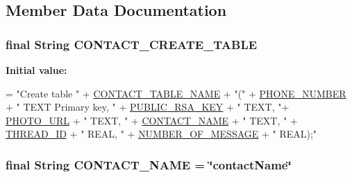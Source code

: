 \subsection{Member Data Documentation}
\hypertarget{a00010_a2ba8d9afb3e24e566831ab37cfd1cb66}{
\subsubsection[{C\+O\+N\+T\+A\+C\+T\+\_\+\+C\+R\+E\+A\+T\+E\+\_\+\+T\+A\+B\+L\+E}]{\setlength{\rightskip}{0pt plus 5cm}final String C\+O\+N\+T\+A\+C\+T\+\_\+\+C\+R\+E\+A\+T\+E\+\_\+\+T\+A\+B\+L\+E\hspace{0.3cm}{\ttfamily [static]}}}\label{a00010_a2ba8d9afb3e24e566831ab37cfd1cb66}
{\bfseries Initial value\+:}
\begin{DoxyCode}
=
            \textcolor{stringliteral}{"Create table "} + \hyperlink{a00010_a23f7383bb6a2bb7dc52d5c6366093d70}{CONTACT\_TABLE\_NAME} +
            \textcolor{stringliteral}{"("} + \hyperlink{a00010_ab82e52128049364660302a3d290f21ff}{PHONE\_NUMBER} + \textcolor{stringliteral}{" TEXT Primary key, "} +
            \hyperlink{a00010_a441e33a0577b5591c0885e4f8f2454f3}{PUBLIC\_RSA\_KEY} + \textcolor{stringliteral}{" TEXT, "}+
            \hyperlink{a00010_a8e08c45856be8a38b4ba9db84b11fa44}{PHOTO\_URL} + \textcolor{stringliteral}{" TEXT, "} +
            \hyperlink{a00010_abf69678c3e436dd320bb4322175b1eb1}{CONTACT\_NAME} + \textcolor{stringliteral}{" TEXT, "} +
            \hyperlink{a00010_a28a7594753498b2109f8b5203f176890}{THREAD\_ID} + \textcolor{stringliteral}{" REAL, "} +
            \hyperlink{a00010_aa3941d45d50130c8c709965c7763429d}{NUMBER\_OF\_MESSAGE} + \textcolor{stringliteral}{" REAL);"}
\end{DoxyCode}
\hypertarget{a00010_abf69678c3e436dd320bb4322175b1eb1}{
\subsubsection[{C\+O\+N\+T\+A\+C\+T\+\_\+\+N\+A\+M\+E}]{\setlength{\rightskip}{0pt plus 5cm}final String C\+O\+N\+T\+A\+C\+T\+\_\+\+N\+A\+M\+E = \char`\"{}contact\+Name\char`\"{}\hspace{0.3cm}{\ttfamily [static]}}}\label{a00010_abf69678c3e436dd320bb4322175b1eb1}
